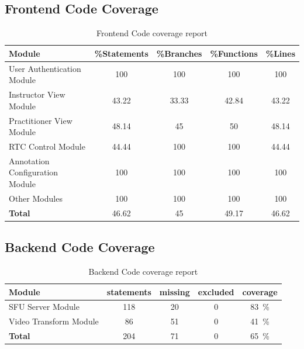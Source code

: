 \documentclass[12pt, titlepage]{article}
\begin{document}
\subsection*{Frontend Code Coverage}

\begin{table}[h!]
  \centering
  \begin{tabular}{@{}lcccc@{}}
    \toprule
    \textbf{Module}                       & \textbf{\%Statements} & \textbf{\%Branches} & \textbf{\%Functions} & \textbf{\%Lines} \\ \midrule
    User Authentication Module      & 100             & 100           & 100            & 100        \\
    Instructor View Module          & 43.22           & 33.33         & 42.84          & 43.22      \\
    Practitioner View Module        & 48.14           & 45            & 50             & 48.14      \\
    RTC Control Module              & 44.44           & 100           & 100            & 44.44      \\
    Annotation Configuration Module & 100             & 100           & 100            & 100        \\
    Other Modules                   & 100             & 100           & 100            & 100        \\
    \midrule
    \textbf{Total}                        & 46.62           & 45            & 49.17          & 46.62      \\ \bottomrule
  \end{tabular}
  \caption{Frontend Code coverage report}
  \label{tab:frontend-cov}
\end{table}

\subsection*{Backend Code Coverage}

\begin{table}[h!]
  \centering
  \begin{tabular}{@{}lcccc@{}}
    \toprule
    \textbf{Module}              & \textbf{statements} & \textbf{missing} & \textbf{excluded} & \textbf{coverage}       \\ \midrule
    SFU Server Module      & 118           & 20         & 0           & \SI{83}{\percent} \\
    Video Transform Module & 86            & 51         & 0           & \SI{41}{\percent} \\ \midrule
    \textbf{Total}               & 204           & 71         & 0           & \SI{65}{\percent} \\ \bottomrule
  \end{tabular}
  \caption{Backend Code coverage report}
  \label{tab:backend-cov}
\end{table}
\end{document}
